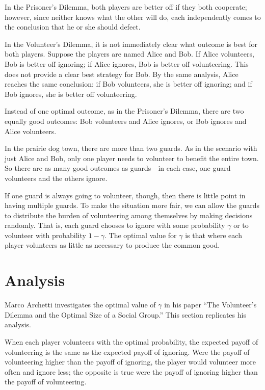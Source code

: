 \documentclass[10pt]{book}
\begin{document}
In the Prisoner's Dilemma, both players are better off
if they both cooperate; however, since neither knows what the other
will do, each independently comes to the conclusion that he or she
should defect.

In the Volunteer's Dilemma, it is not immediately
clear what outcome is best for both players.  Suppose the players
are named Alice and Bob.  If Alice volunteers, Bob is better off ignoring;
if Alice ignores, Bob is better off volunteering.  This does not
provide a clear best strategy for Bob.  By the same
analysis, Alice reaches the same
conclusion: if Bob volunteers, she is better
off ignoring; and if Bob ignores, she is better off volunteering.

Instead of one optimal outcome, as in the Prisoner's Dilemma, there
are two equally good outcomes: Bob volunteers
and Alice ignores, or Bob ignores and Alice volunteers.

In the prairie dog town, there are more than two guards.  As in the
scenario with just Alice and Bob, only one player needs to volunteer
to benefit the entire town.  So there are as many good outcomes as
guards---in each case, one guard volunteers and the others ignore.

If one guard is always going to volunteer, though, then there is
little point in having multiple guards.  To make the situation more
fair, we can allow the guards to distribute the burden of volunteering among
themselves by making decisions randomly.  That is, each guard 
chooses to ignore with some 
probability $\gamma$ or to volunteer with probability $1 - \gamma$.
The optimal value for $\gamma$ is that where each player volunteers as
little as necessary to produce the common good.

\section{Analysis}

Marco Archetti investigates the optimal value of $\gamma$ in his
paper ``The Volunteer's Dilemma and the Optimal Size of a Social
Group.''  This section replicates his analysis. 

When each player volunteers with the optimal probability,
the expected payoff of volunteering is the same as the expected payoff
of ignoring.  Were the payoff of volunteering higher than the payoff
of ignoring, the player would volunteer more often and ignore less;
the opposite is true were the payoff of ignoring higher than the
payoff of volunteering.
\end{document}

